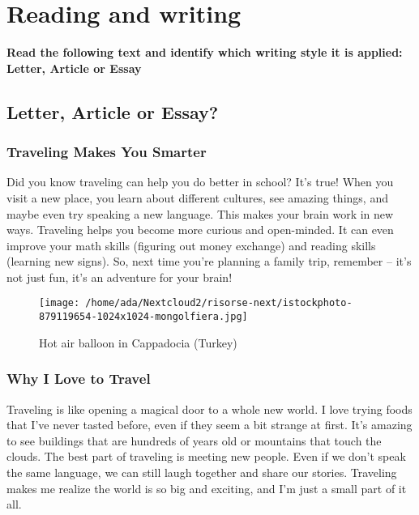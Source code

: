 \documentclass[]{article} %
\begin{document}
	
\section*{Reading and writing}

\begin{question}
	\textbf{Read the following text and identify which writing style it is applied: Letter, Article or Essay}
\end{question}	


\subsection*{Letter, Article or Essay?}

\subsubsection*{Traveling Makes You Smarter}

Did you know traveling can help you do better in school? It's true! When you visit a new place, you learn about different cultures, see amazing things, and maybe even try speaking a new language. This makes your brain work in new ways. Traveling helps you become more curious and open-minded. It can even improve your math skills (figuring out money exchange) and reading skills (learning new signs). So, next time you're planning a family trip, remember – it's not just fun, it's an adventure for your brain!

\begin{wrapfigure}{r}{0.5\textwidth}
	\raggedleft
	\texttt{[image: /home/ada/Nextcloud2/risorse-next/istockphoto-879119654-1024x1024-mongolfiera.jpg]}
	\caption {Hot air balloon in Cappadocia (Turkey)}
\end{wrapfigure}

\subsubsection*{Why I Love to Travel}

Traveling is like opening a magical door to a whole new world. I love trying foods that I've never tasted before, even if they seem a bit strange at first. It's amazing to see buildings that are hundreds of years old or mountains that touch the clouds. The best part of traveling is meeting new people. Even if we don't speak the same language, we can still laugh together and share our stories. Traveling makes me realize the world is so big and exciting, and I'm just a small part of it all.
\end{document}
